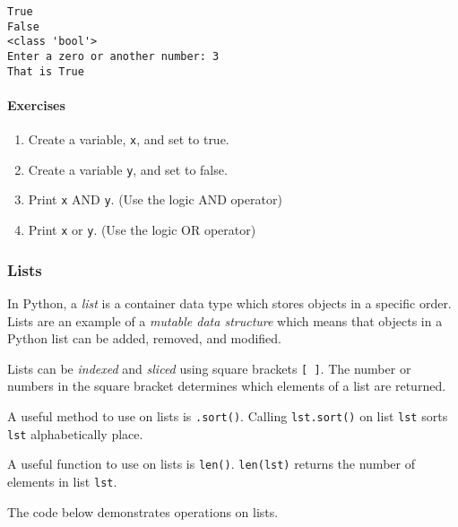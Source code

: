 \documentclass[11pt]{article}
\providecommand{\tightlist}{%
      \setlength{\itemsep}{0pt}\setlength{\parskip}{0pt}}
\begin{document}
    \begin{Verbatim}[commandchars=\\\{\}]
True
False
<class 'bool'>
Enter a zero or another number: 3
That is True

    \end{Verbatim}

    \hypertarget{exercises}{%
\paragraph{Exercises}\label{exercises}}

\begin{enumerate}
\def\labelenumi{\arabic{enumi}.}
\tightlist
\item
  Create a variable, \texttt{x}, and set to true.
\item
  Create a variable \texttt{y}, and set to false.
\item
  Print \texttt{x} AND \texttt{y}. (Use the logic AND operator)
\item
  Print \texttt{x} or \texttt{y}. (Use the logic OR operator)
\end{enumerate}

    \hypertarget{lists}{%
\subsubsection{Lists}\label{lists}}

In Python, a \emph{list} is a container data type which stores objects
in a specific order. Lists are an example of a \emph{mutable data
structure} which means that objects in a Python list can be added,
removed, and modified.

Lists can be \emph{indexed} and \emph{sliced} using square brackets
\texttt{{[}\ {]}}. The number or numbers in the square bracket
determines which elements of a list are returned.

A useful method to use on lists is \texttt{.sort()}. Calling
\texttt{lst.sort()} on list \texttt{lst} sorts \texttt{lst}
alphabetically place.

A useful function to use on lists is \texttt{len()}. \texttt{len(lst)}
returns the number of elements in list \texttt{lst}.

The code below demonstrates operations on lists.
\end{document}
